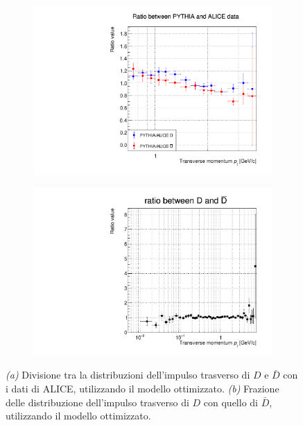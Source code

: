 \begin{figure}[htp]
    \centering
    \begin{subfigure}{.49\textwidth}
    \centering
        \includegraphics[width=\textwidth]{image/3-risultati/analyse/G/division.pdf}
        \caption{}
        \label{fig:D_division}
    \end{subfigure}
    \begin{subfigure}{.49\textwidth}
        \centering
        \includegraphics[width=\textwidth]{image/3-risultati/analyse/G/ratio_DD.pdf}
        \caption{}
        \label{fig:D_ratio_DD}
    \end{subfigure}
    \caption{\emph{\rmfamily (a)} Divisione tra la distribuzioni dell'impulso trasverso di $D$ e $\bar D$ con i dati di ALICE, utilizzando il modello ottimizzato. \emph{\rmfamily (b)} Frazione delle distribuzione dell'impulso trasverso di $D$ con quello di $\bar D$, utilizzando il modello ottimizzato.}
    \label{fig:D_ratio_DD_}
\end{figure}

